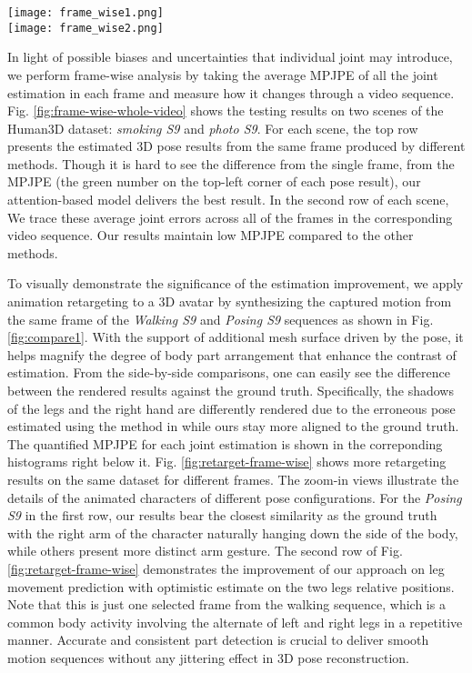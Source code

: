 \documentclass[twocolumn]{svjour3}          \smartqed  \usepackage{graphicx}
\begin{document}
\begin{figure*}
    \centering
    \texttt{[image: frame\_wise1.png]}\\
    \texttt{[image: frame\_wise2.png]}
    \caption{Frame-wise comparasion with state-of-the-art results.}
    \label{fig:frame-wise-whole-video}
\end{figure*}

In light of possible biases and uncertainties that individual joint may introduce, we perform frame-wise analysis by taking the average MPJPE of all the joint estimation in each frame and measure how it changes through a video sequence. Fig. \ref{fig:frame-wise-whole-video} shows the testing results on two scenes of the Human3D dataset: \emph{smoking S9} and \emph{photo S9}. For each scene, the top row presents the estimated 3D pose results from the same frame produced by different methods. Though it is hard to see the difference from the single frame, from the MPJPE (the green number on the top-left corner of each pose result), our attention-based model delivers the best result. In the second row of each scene, We  trace these average joint errors across all of the frames in the corresponding video sequence. Our results maintain low MPJPE compared to the other methods. 
 
To visually demonstrate the significance of the estimation improvement, we apply animation retargeting to a 3D avatar by synthesizing the captured motion from the same frame of the \emph{Walking S9} and  \emph{Posing S9} sequences as shown in Fig. \ref{fig:compare1}. With the support of additional mesh surface driven by the pose, it helps magnify the degree of body part arrangement that enhance the contrast of estimation. From the side-by-side comparisons, one can easily see the difference between the rendered results against the ground truth. Specifically, the shadows of the legs and the right hand are differently rendered due to the erroneous pose estimated using the method in \citep{Pavllo2019} while ours stay more aligned to the ground truth. The quantified MPJPE for each joint estimation is shown in the correponding histograms right below it. Fig. \ref{fig:retarget-frame-wise} shows more retargeting results on the same dataset for different frames. The zoom-in views illustrate the details of the animated characters of different pose configurations. For the \emph{Posing S9} in the first row, our results bear the closest similarity as the ground truth with the right arm of the character naturally hanging down the side of the body, while others present more distinct arm gesture. The second row of Fig. \ref{fig:retarget-frame-wise} demonstrates the improvement of our approach on leg movement prediction with optimistic estimate on the two legs relative positions. Note that this is just one selected frame from the walking sequence, which is a common body activity involving the alternate of left and right legs in a repetitive manner. Accurate and consistent part detection is crucial to deliver  smooth motion sequences without any jittering effect in 3D pose reconstruction. 
\end{document}
